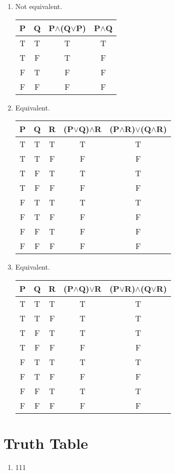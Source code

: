 \documentclass{article}
\begin{document}
		\begin{enumerate}
			\item Not equivalent.
			
			\begin{tabular}{|c|c|c|c|}
				\hline
				P & Q & P$\wedge$(Q$\vee$P) & P$\wedge$Q \\ \hline
				T & T & T & T \\ \hline
				T & F & T & F \\ \hline
				F & T & F & F \\ \hline
				F & F & F & F \\ \hline
			\end{tabular}
			\item Equivalent.
			
			\begin{tabular}{|c|c|c|c|c|}
				\hline
				P & Q & R & (P$\vee$Q)$\wedge$R & (P$\wedge$R)$\vee$(Q$\wedge$R) \\ \hline
				T & T & T & T & T \\ \hline
				T & T & F & F & F \\ \hline
				T & F & T & T & T \\ \hline
				T & F & F & F & F \\ \hline
				F & T & T & T & T \\ \hline
				F & T & F & F & F \\ \hline
				F & F & T & F & F \\ \hline
				F & F & F & F & F \\ \hline 
			\end{tabular}
			\item Equivalent.
			
			\begin{tabular}{|c|c|c|c|c|}
				\hline
				P & Q & R & (P$\wedge$Q)$\vee$R & (P$\vee$R)$\wedge$(Q$\vee$R) \\ \hline
				T & T & T & T & T \\ \hline
				T & T & F & T & T \\ \hline
				T & F & T & T & T \\ \hline
				T & F & F & F & F \\ \hline
				F & T & T & T & T \\ \hline
				F & T & F & F & F \\ \hline
				F & F & T & T & T \\ \hline
				F & F & F & F & F \\ \hline 
			\end{tabular}
		\end{enumerate}
	\newpage
	\section{Truth Table}
		\begin{enumerate}
			\item 111
		\end{enumerate}
\end{document}
